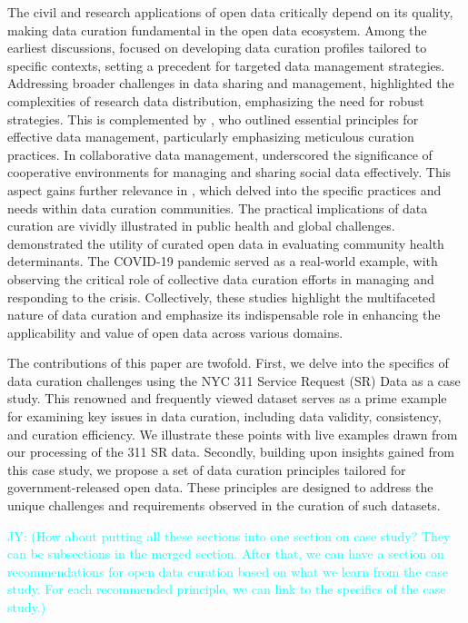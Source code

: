 \documentclass[12pt, titlepage]{article}
\newcommand{\jy}[1]{\textcolor{cyan}{JY: (#1)}}
\begin{document}
The civil and research applications of open data critically depend on
its quality, making data curation fundamental in the open data
ecosystem. Among the earliest discussions,
\citet{witt2009constructing} focused on developing data curation
profiles tailored to specific contexts, setting a precedent for
targeted data management strategies. Addressing broader challenges in
data sharing and management, \citet{borgman2012conundrum} highlighted
the complexities of research data distribution, emphasizing the need
for robust strategies. This is complemented by \citet{hart2016ten},
who outlined essential principles for effective data management,
particularly emphasizing meticulous curation practices. In
collaborative data management, \citet{beheshti2019datasynapse}
underscored the significance of cooperative environments for managing
and sharing social data effectively. This aspect gains further
relevance in \citet{mclure2014data}, which delved into the specific
practices and needs within data curation communities. The practical
implications of data curation are vividly illustrated in public health
and global challenges. \citet{cantor2018facets} demonstrated the
utility of curated open data in evaluating community health
determinants. The COVID-19 pandemic served as a real-world example,
with \citet{shankar2021data} observing the critical role of collective
data curation efforts in managing and responding to the
crisis. Collectively, these studies highlight the multifaceted nature
of data curation and emphasize its indispensable role in enhancing the
applicability and value of open data across various domains.


The contributions of this paper are twofold. First, we delve into
the specifics of data curation challenges using the NYC 311 Service
Request (SR) Data as a case study. This renowned and frequently viewed 
dataset serves as a prime example for examining key issues in data curation, 
including data validity, consistency, and curation efficiency. 
We illustrate these points with live examples drawn from our 
processing of the 311 SR data. Secondly, building upon insights 
gained from this case study, we propose a set of data curation 
principles tailored for government-released open data. These 
principles are designed to address the unique challenges 
and requirements observed in the curation of such datasets.

\jy{How about putting all these sections into one section on case
  study? They can be subsections in the merged section.
  After that, we can have a section on recommendations for open
  data curation based on what we learn from the case study. For each
  recommended principle, we can link to the specifics of the case
  study.}
\end{document}

